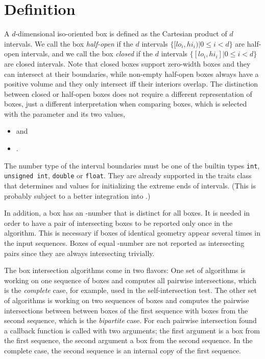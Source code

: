 \section{Definition}\label{sec:box-inters-def}

A $d$-dimensional iso-oriented box is defined as the Cartesian product
of $d$ intervals. We call the box \emph{half-open} if the $d$
intervals $\{ [lo_i,hi_i) | 0 \leq i < d\}$ are half-open intervals,
and we call the box \emph{closed} if the $d$ intervals $\{ [lo_i,hi_i]
| 0 \leq i < d\}$ are closed intervals. Note that closed boxes support
zero-width boxes and they can intersect at their boundaries, while
non-empty half-open boxes always have a positive volume and they only
intersect iff their interiors overlap.  The distinction between closed
or half-open boxes does not require a different representation of
boxes, just a different interpretation when comparing boxes, which is
selected with the  parameter and its two values,

\begin{itemize}
  \item {} and
  \item {}.
\end{itemize}

The number type of the interval boundaries must be one of the builtin
types \texttt{int}, \texttt{unsigned int}, \texttt{double} or
\texttt{float}. They are already supported in the
 traits class that
determines  and  values for initializing the
extreme ends of intervals. (This is probably subject to a better integration
into \cgal.)

In addition, a box has an -number that is distinct for all
boxes. It is needed in order to have a pair of intersecting boxes to
be reported only once in the algorithm. This is necessary if boxes of
identical geometry appear several times in the input sequences.  Boxes
of equal -number are not reported as intersecting pairs since
they are always intersecting trivially.

The box intersection algorithms come in two flavors: One set of
algorithms is working on one sequence of boxes and computes all
pairwise intersections, which is the \emph{complete\/} case, for
example, used in the self-intersection test. The other set of
algorithms is working on two sequences of boxes and computes the
pairwise intersections between between boxes of the first sequence
with boxes from the second sequence, which is the \emph{bipartite\/}
case. For each pairwise intersection found a callback function is
called with two arguments; the first argument is a box from the first
sequence, the second argument a box from the second sequence. In the
complete case, the second sequence is an internal copy of the first
sequence.



